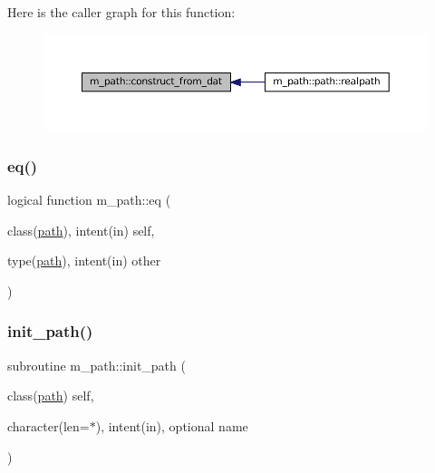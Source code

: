 Here is the caller graph for this function\+:\nopagebreak
\begin{figure}[H]
\begin{center}
\leavevmode
\includegraphics[width=350pt]{namespacem__path_ae223f8623f7a985d4349e08bc7540d53_icgraph}
\end{center}
\end{figure}
\mbox{\label{namespacem__path_ac073eb26c4277f48777df68b8e2dfcfd}} 
\subsubsection{\texorpdfstring{eq()}{eq()}}
{\footnotesize\ttfamily logical function m\+\_\+path\+::eq (\begin{DoxyParamCaption}\item[{class(\mbox{\hyperlink{structm__path_1_1path}{path}}), intent(in)}]{self,  }\item[{type(\mbox{\hyperlink{structm__path_1_1path}{path}}), intent(in)}]{other }\end{DoxyParamCaption})\hspace{0.3cm}{\ttfamily [private]}}

\mbox{\label{namespacem__path_ad3027220a3a7decb9dd35ddb41a91250}} 
\subsubsection{\texorpdfstring{init\+\_\+path()}{init\_path()}}
{\footnotesize\ttfamily subroutine m\+\_\+path\+::init\+\_\+path (\begin{DoxyParamCaption}\item[{class(\mbox{\hyperlink{structm__path_1_1path}{path}})}]{self,  }\item[{character(len=$\ast$), intent(in), optional}]{name }\end{DoxyParamCaption})\hspace{0.3cm}{\ttfamily [private]}}


